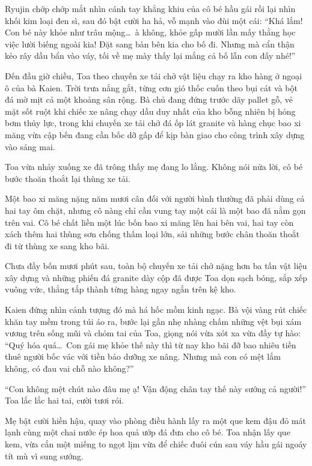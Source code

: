 \documentclass[../main.tex]{subfiles}
\begin{document}
Ryujin chớp chớp mắt nhìn cánh tay khẳng khiu của cô bé hầu gái rồi lại nhìn khối kim loại đen sì, sau đó bật cười ha hả, vỗ mạnh vào đùi một cái: ``Khá lắm! Con bé này khỏe như trâu mộng\dots\ à không, khỏe gấp mười lần mấy thằng học việc lười biếng ngoài kia! Đặt sang bàn bên kia cho bố đi. Nhưng mà cẩn thận kẻo rây dầu bẩn vào váy, tối về mẹ mày thấy lại mắng cả bố lẫn con đấy nhé!''

\ct

Đến đầu giờ chiều, Toa theo chuyến xe tải chở vật liệu chạy ra kho hàng ở ngoại ô của bà Kaien. Trời trưa nắng gắt, từng cơn gió thốc cuốn theo bụi cát và bột đá mờ mịt cả một khoảng sân rộng. Bà chủ đang đứng trước dãy pallet gỗ, vẻ mặt sốt ruột khi chiếc xe nâng chạy dầu duy nhất của kho bỗng nhiên bị hỏng bơm thủy lực, trong khi chuyến xe tải chở đá ốp lát granite và hàng chục bao xi măng vừa cập bến đang cần bốc dỡ gấp để kịp bàn giao cho công trình xây dựng vào sáng mai.

Toa vừa nhảy xuống xe đã trông thấy mẹ đang lo lắng. Không nói nửa lời, cô bé bước thoăn thoắt lại thùng xe tải.

Một bao xi măng nặng năm mươi cân đối với người bình thường đã phải dùng cả hai tay ôm chặt, nhưng cô nàng chỉ cần vung tay một cái là một bao đã nằm gọn trên vai. Cô bé chất liền một lúc bốn bao xi măng lên hai bên vai, hai tay còn xách thêm hai thùng sơn chống thấm loại lớn, sải những bước chân thoăn thoắt đi từ thùng xe sang kho bãi.

Chưa đầy bốn mươi phút sau, toàn bộ chuyến xe tải chở nặng hơn ba tấn vật liệu xây dựng và những phiến đá granite dày cộp đã được Toa dọn sạch bóng, sắp xếp vuông vức, thẳng tắp thành từng hàng ngay ngắn trên kệ kho.

Kaien đứng nhìn cảnh tượng đó mà há hốc mồm kinh ngạc. Bà vội vàng rút chiếc khăn tay mềm trong túi áo ra, bước lại gần nhẹ nhàng chấm những vệt bụi xám vương trên sống mũi và chỏm tai của Toa, giọng nói vừa xót xa vừa đầy tự hào: ``Quý hóa quá\dots\ Con gái mẹ khỏe thế này thì từ nay kho bãi đỡ bao nhiêu tiền thuê người bốc vác với tiền bảo dưỡng xe nâng. Nhưng mà con có mệt lắm không, có đau vai chỗ nào không?''

``Con không mệt chút nào đâu mẹ ạ! Vận động chân tay thế này sướng cả người!'' Toa lắc lắc hai tai, cười tươi rói.

Mẹ bật cười hiền hậu, quay vào phòng điều hành lấy ra một que kem đậu đỏ mát lạnh cùng một chai nước ép hoa quả ướp đá đưa cho cô bé. Toa nhận lấy que kem, vừa cắn một miếng to ngọt lịm vừa để chiếc đuôi cún sau váy hầu gái ngoáy tít mù vì sung sướng.
\end{document}
